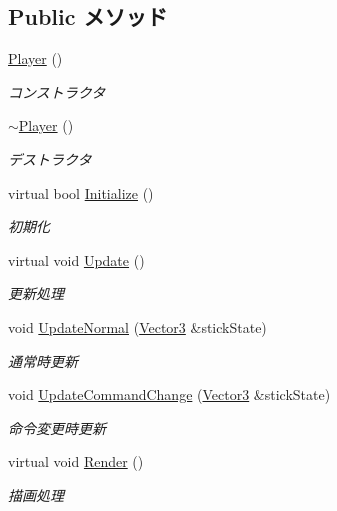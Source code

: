 \subsection*{Public メソッド}
\begin{DoxyCompactItemize}
\item 
\hyperlink{class_player_affe0cc3cb714f6deb4e62f0c0d3f1fd8}{Player} ()
\begin{DoxyCompactList}\small\item\em コンストラクタ \end{DoxyCompactList}\item 
\hyperlink{class_player_a749d2c00e1fe0f5c2746f7505a58c062}{$\sim$\-Player} ()
\begin{DoxyCompactList}\small\item\em デストラクタ \end{DoxyCompactList}\item 
virtual bool \hyperlink{class_player_ac9ff471df2bd80c9c087d1cb153feb2c}{Initialize} ()
\begin{DoxyCompactList}\small\item\em 初期化 \end{DoxyCompactList}\item 
virtual void \hyperlink{class_player_a05b60cac1922c5be5c1be16baffa4497}{Update} ()
\begin{DoxyCompactList}\small\item\em 更新処理 \end{DoxyCompactList}\item 
void \hyperlink{class_player_aff8e175f69917de3b1dac6400f2a02e5}{Update\-Normal} (\hyperlink{struct_vector3}{Vector3} \&stick\-State)
\begin{DoxyCompactList}\small\item\em 通常時更新 \end{DoxyCompactList}\item 
void \hyperlink{class_player_a1812b4ce37487ac153d8ba2042009bad}{Update\-Command\-Change} (\hyperlink{struct_vector3}{Vector3} \&stick\-State)
\begin{DoxyCompactList}\small\item\em 命令変更時更新 \end{DoxyCompactList}\item 
virtual void \hyperlink{class_player_ad141ea844ac82f2447d986d964d1e8a7}{Render} ()
\begin{DoxyCompactList}\small\item\em 描画処理 \end{DoxyCompactList}\item 

\end{DoxyCompactItemize}
